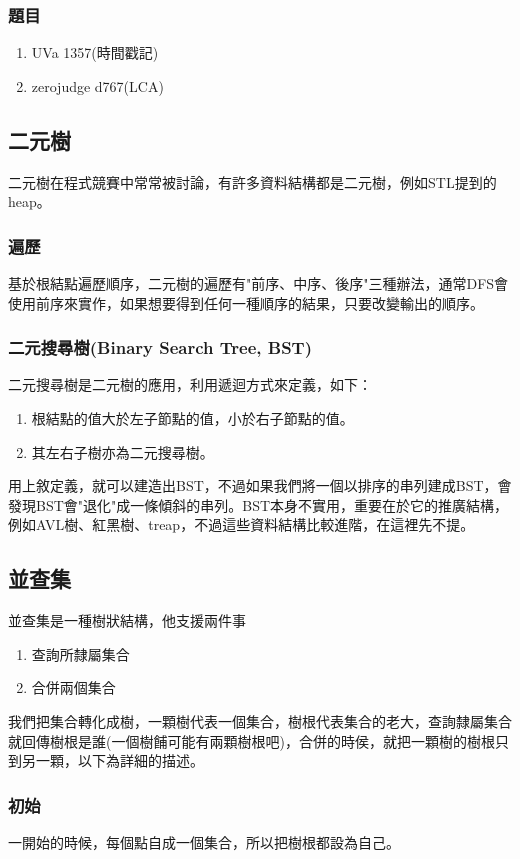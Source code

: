 \subsubsection{題目}
\begin{enumerate}
\item UVa 1357(時間戳記)
\item zerojudge d767(LCA)
\end{enumerate}
\subsection{二元樹}
二元樹在程式競賽中常常被討論，有許多資料結構都是二元樹，例如STL提到的heap。
\subsubsection{遍歷}
基於根結點遍歷順序，二元樹的遍歷有"前序、中序、後序"三種辦法，通常DFS會使用前序來實作，如果想要得到任何一種順序的結果，只要改變輸出的順序。

\subsubsection{二元搜尋樹(Binary Search Tree, BST)}
二元搜尋樹是二元樹的應用，利用遞迴方式來定義，如下：
\begin{enumerate}
\item 根結點的值大於左子節點的值，小於右子節點的值。
\item 其左右子樹亦為二元搜尋樹。
\end{enumerate}
用上敘定義，就可以建造出BST，不過如果我們將一個以排序的串列建成BST，會發現BST會"退化"成一條傾斜的串列。BST本身不實用，重要在於它的推廣結構，例如AVL樹、紅黑樹、treap，不過這些資料結構比較進階，在這裡先不提。
\subsection{並查集}
並查集是一種樹狀結構，他支援兩件事
\begin{enumerate}
\item 查詢所隸屬集合
\item 合併兩個集合
\end{enumerate}
我們把集合轉化成樹，一顆樹代表一個集合，樹根代表集合的老大，查詢隸屬集合就回傳樹根是誰(一個樹餔可能有兩顆樹根吧)，合併的時侯，就把一顆樹的樹根只到另一顆，以下為詳細的描述。
\subsubsection{初始}
一開始的時候，每個點自成一個集合，所以把樹根都設為自己。
